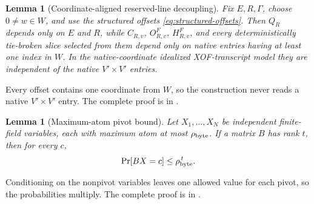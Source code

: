 \documentclass[11pt]{article}
\newtheorem{lemma}[theorem]{Lemma}
\begin{document}
\begin{lemma}[Coordinate-aligned reserved-line decoupling]
\label{lem:reserved-decoupling}
Fix $E,R,\Gamma$, choose $0\ne w\in W$, and use the structured offsets
\eqref{eq:structured-offsets}.  Then $Q_R$ depends only on $E$ and $R$, while
$C_{R,v}$, $O^F_{R,v}$, $H^F_{R,v}$, and every deterministically tie-broken
slice selected from them depend only on native entries having at least one
index in $W$.  In the native-coordinate idealized XOF-transcript model they are
independent of the native $V'\times V'$ entries.
\end{lemma}

Every offset contains one coordinate from $W$, so the construction never reads
a native $V'\times V'$ entry.  The complete proof is in
.

\begin{lemma}[Maximum-atom pivot bound]\label{lem:max-atom-pivot}
Let $X_1,\ldots,X_N$ be independent finite-field variables, each with maximum
atom at most $\rho_{\rm byte}$.  If a matrix $B$ has rank $t$, then for every
$c$,
\[
 \Pr[BX=c]\le\rho_{\rm byte}^{\,t}.
\]
\end{lemma}

Conditioning on the nonpivot variables leaves one allowed value for each pivot,
so the probabilities multiply.  The complete proof is in
.
\end{document}
